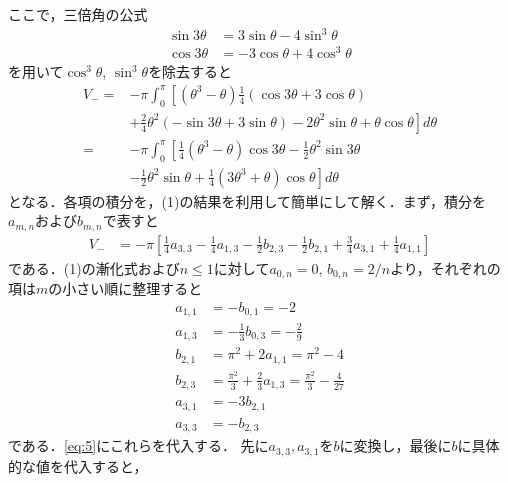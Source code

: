 \documentclass[a4paper,10pt]{ltjsarticle}
\begin{document}
\begin{multicols}{2}
  ここで，三倍角の公式
  \begin{align*}
    \sin 3\theta & = 3\sin\theta - 4 \sin^3\theta \\
    \cos 3\theta & =-3\cos\theta + 4 \cos^3\theta
  \end{align*}
  を用いて$\cos^3\theta$, $\sin^3\theta$を除去すると
  \begin{align*}
    V_{-}
    = & -\pi \int_{0}^{\pi} \left[
    \left(\theta^3-\theta\right)\frac{1}{4}\left(\cos 3\theta + 3\cos\theta \right)\right. \\
      & + \left. \frac{2}{4}\theta^2\left(-\sin 3\theta + 3\sin\theta \right)
    -2 \theta^2\sin\theta + \theta \cos\theta \right]  d\theta                             \\
    = & -\pi \int_{0}^{\pi} \left[
      \frac{1}{4}\left(\theta^3-\theta\right)\cos 3\theta
    -\frac{1}{2}\theta^2\sin 3\theta \right.                                               \\
      & \left. -\frac{1}{2}\theta^2\sin\theta
      +\frac{1}{4} \left(3\theta^3+\theta\right) \cos\theta \right]  d\theta
  \end{align*}
  となる．各項の積分を，(1)の結果を利用して簡単にして解く．まず，積分を$a_{m,n}$および$b_{m,n}$で表すと
  \begin{align}
    V_{-}
     & = -\pi \left[ \frac{1}{4}a_{3,3}-\frac{1}{4}a_{1,3} - \frac{1}{2}b_{2,3} -\frac{1}{2}b_{2,1}+\frac{3}{4}a_{3,1}+\frac{1}{4}a_{1,1} \right] \label{eq:5}
  \end{align}
  である．(1)の漸化式および$n\le 1$に対して$a_{0,n}=0$, $b_{0,n}=2/n$より，それぞれの項は$m$の小さい順に整理すると
  \begin{align*}
    a_{1,1} & = - b_{0,1} = -2                                                         \\
    a_{1,3} & = -\frac{1}{3} b_{0,3} = -\frac{2}{9}                                    \\
    b_{2,1} & = \pi^2 + 2 a_{1,1} = \pi^2 - 4                                          \\
    b_{2,3} & = \frac{\pi^2}{3} + \frac{2}{3} a_{1,3} = \frac{\pi^2}{3} - \frac{4}{27} \\
    a_{3,1} & = - 3 b_{2,1}                                                            \\
    a_{3,3} & = -b_{2,3}
  \end{align*}
  である．\cref{eq:5}にこれらを代入する．
  先に$a_{3,3}, a_{3,1}$を$b$に変換し，最後に$b$に具体的な値を代入すると，
  \begin{align}

\end{align}
\end{multicols}
\end{document}
